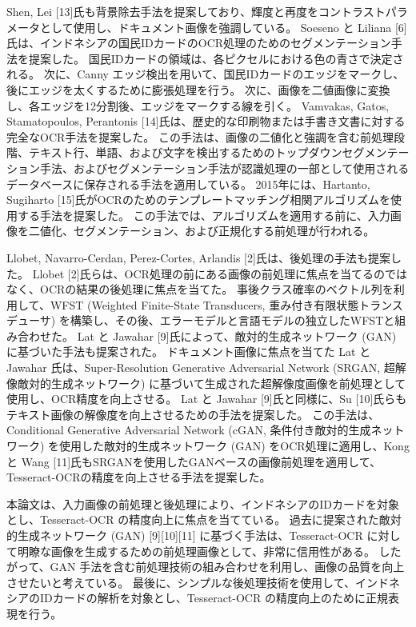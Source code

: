 \documentclass[uplatex, twocolumn,10pt]{jsarticle}
\begin{document}
Shen, Lei [13]氏も背景除去手法を提案しており、輝度と再度をコントラストパラメータとして使用し、ドキュメント画像を強調している。
Soeseno と Liliana [6]氏は、インドネシアの国民IDカードのOCR処理のためのセグメンテーション手法を提案した。
国民IDカードの領域は、各ピクセルにおける色の青さで決定される。
次に、Canny エッジ検出を用いて、国民IDカードのエッジをマークし、後にエッジを太くするために膨張処理を行う。
次に、画像を二値画像に変換し、各エッジを12分割後、エッジをマークする線を引く。
Vamvakas, Gatos, Stamatopoulos, Perantonis [14]氏は、歴史的な印刷物または手書き文書に対する完全なOCR手法を提案した。
この手法は、画像の二値化と強調を含む前処理段階、テキスト行、単語、および文字を検出するためのトップダウンセグメンテーション手法、およびセグメンテーション手法が認識処理の一部として使用されるデータベースに保存される手法を適用している。
2015年には、Hartanto, Sugiharto [15]氏がOCRのためのテンプレートマッチング相関アルゴリズムを使用する手法を提案した。
この手法では、アルゴリズムを適用する前に、入力画像を二値化、セグメンテーション、および正規化する前処理が行われる。

Llobet, Navarro-Cerdan, Perez-Cortes, Arlandis [2]氏は、後処理の手法も提案した。
Llobet [2]氏らは、OCR処理の前にある画像の前処理に焦点を当てるのではなく、OCRの結果の後処理に焦点を当てた。
事後クラス確率のベクトル列を利用して、WFST (Weighted Finite-State Transducers, 重み付き有限状態トランスデューサ) を構築し、その後、エラーモデルと言語モデルの独立したWFSTと組み合わせた。
Lat と Jawahar [9]氏によって、敵対的生成ネットワーク (GAN) に基づいた手法も提案された。
ドキュメント画像に焦点を当てた Lat と Jawahar 氏は、Super-Resolution Generative Adversarial Network (SRGAN, 超解像敵対的生成ネットワーク) に基づいて生成された超解像度画像を前処理として使用し、OCR精度を向上させる。
Lat と Jawahar [9]氏と同様に、Su [10]氏らもテキスト画像の解像度を向上させるための手法を提案した。
この手法は、Conditional Generative Adversarial Network (cGAN, 条件付き敵対的生成ネットワーク) を使用した敵対的生成ネットワーク (GAN) をOCR処理に適用し、Kong と Wang [11]氏もSRGANを使用したGANベースの画像前処理を適用して、Tesseract-OCRの精度を向上させる手法を提案した。

本論文は、入力画像の前処理と後処理により、インドネシアのIDカードを対象とし、Tesseract-OCR の精度向上に焦点を当てている。
過去に提案された敵対的生成ネットワーク (GAN) [9][10][11] に基づく手法は、Tesseract-OCR に対して明瞭な画像を生成するための前処理画像として、非常に信用性がある。
したがって、GAN 手法を含む前処理技術の組み合わせを利用し、画像の品質を向上させたいと考えている。
最後に、シンプルな後処理技術を使用して、インドネシアのIDカードの解析を対象とし、Tesseract-OCR の精度向上のために正規表現を行う。
\end{document}
